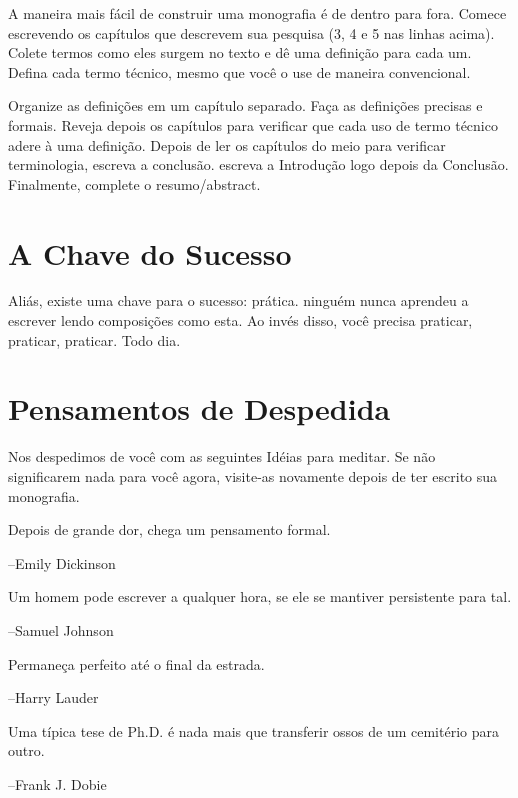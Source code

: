A maneira mais fácil de construir uma monografia é de dentro para fora. Comece escrevendo os capítulos que descrevem sua pesquisa (3, 4 e 5 nas linhas acima). Colete termos como eles surgem no texto e dê uma definição para cada um.
Defina cada termo técnico,  mesmo que você o use de maneira convencional.

Organize as definições em um capítulo separado. Faça as definições precisas e formais. Reveja depois os capítulos para verificar que cada uso de termo técnico adere à uma definição. Depois de ler os capítulos do meio para verificar terminologia, escreva a conclusão. escreva a Introdução logo depois da Conclusão. Finalmente, complete o resumo/abstract.

\section{A Chave do Sucesso}

Aliás, existe uma chave para o sucesso: prática. ninguém nunca aprendeu a escrever lendo composições como esta. Ao invés disso, você precisa praticar, praticar, praticar. Todo dia.

\section{Pensamentos de Despedida}

Nos despedimos de você com as seguintes Idéias para meditar. Se não significarem nada para você agora, visite-as novamente depois de ter escrito sua monografia.

	

	\indent\indent Depois de grande dor, chega um pensamento formal.

		\indent \indent \indent --Emily Dickinson

		
	\indent\indent Um homem pode escrever a qualquer hora, se ele se mantiver persistente para tal.

		\indent \indent \indent --Samuel Johnson

		
	\indent\indent Permaneça perfeito até o final da estrada.

		\indent \indent \indent --Harry Lauder

	 
	\indent\indent Uma típica tese de Ph.D. é nada mais que transferir ossos de um cemitério para outro.

		\indent \indent \indent --Frank J. Dobie

	
	
	
	
	
	
	
	








	
	
	
	
	
	
	
	
	
	
	
	
	
	
